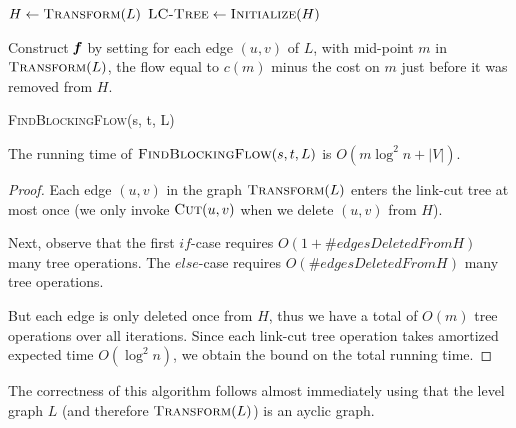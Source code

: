 \begin{algorithm}[H]
  \SetAlgoLined
  $H \leftarrow \textsc{Transform}(L)$\;
  $\textsc{LC-Tree} \gets \textsc{Initialize}(H)$\;
  
  Construct $\boldsymbol{\mathit{f}}$ by setting for each edge $(u,v)$ of $L$, with mid-point $m$ in $\textsc{Transform}(L)$, the flow equal to $c(m)$ minus the cost on $m$ just before it was removed from $H$.
  \caption{\textsc{FindBlockingFlow}(s, t, L)}
\end{algorithm}

\begin{claim}
The running time of $\textsc{FindBlockingFlow}(s, t, L)$ is $O(m \log^2 n + |V|)$.
\end{claim}
\begin{proof}
Each edge $(u,v)$ in the graph $\textsc{Transform}(L)$ enters the link-cut tree at most once (we only invoke $\textsc{Cut}(u,v)$ when we delete $(u,v)$ from $H$). 

Next, observe that the first $if$-case requires $O(1 + \#edgesDeletedFromH)$ many tree operations. The $else$-case requires $O(\#edgesDeletedFromH)$ many tree operations. 

But each edge is only deleted once from $H$, thus we have a total of $O(m)$ tree operations over all iterations. Since each link-cut tree operation takes amortized expected time $O(\log^2 n)$, we obtain the bound on the total running time. 
\end{proof}

The correctness of this algorithm follows almost immediately using that the level graph $L$ (and therefore $\textsc{Transform}(L)$) is an ayclic graph.

